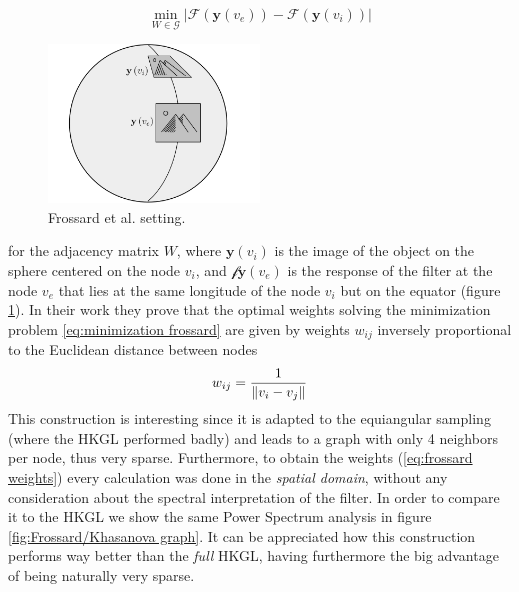 \begin{equation}\label{eq:minimization frossard}
	\min_{W\in\mathcal G} \left|\mathcal{F}\left(\mathbf{y}\left(v_{ e}\right)\right)-\mathcal{F}\left(\mathbf{y}\left(v_{ i}\right)\right)\right|
\end{equation}
\begin{figure}
	\begin{center}
		\includegraphics[width=0.5\textwidth]{figs/Chapter3/frossard2.png}
	\end{center}
	\caption{\label{fig:frossard2}Frossard et al. setting.}
\end{figure}
for the adjacency matrix $W$, where $\mathbf y(v_i)$ is the image of the object on the sphere centered on the node $v_i$, and $\mathcal f\mathbf y(v_e)$ is the response of the filter at the node $v_e$ that lies at the same longitude of the node $v_i$ but on the equator (figure \ref{fig:frossard2}). In their work they prove that the optimal weights solving the minimization problem \ref{eq:minimization frossard} are given by weights $w_{ij}$ inversely proportional to the Euclidean distance between nodes
\begin{equation}\label{eq:frossard weights}
	w_{ij} = \frac{1}{\left\lVert v_i-v_j\right\rVert}
\end{equation}
This construction is interesting since it is adapted to the equiangular sampling (where the HKGL performed badly) and leads to a graph with only 4 neighbors per node, thus very sparse. Furthermore, to obtain the weights (\ref{eq:frossard weights}) every calculation was done in the \textit{spatial domain}, without any consideration about the spectral interpretation of the filter. In order to compare it to the HKGL we show the same Power Spectrum analysis in figure \ref{fig:Frossard/Khasanova graph}. It can be appreciated how this construction performs way better than the \textit{full} HKGL, having furthermore the big advantage of being naturally very sparse.
